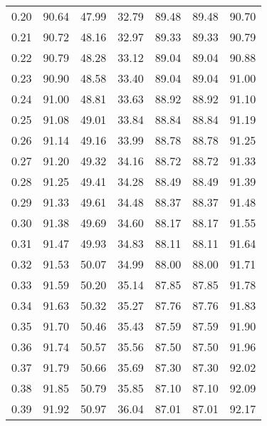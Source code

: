 \begin{tabular}{|c|c|c|c|c|c|c|}
      0.20 &     90.64 &     47.99 &      32.79 &   89.48 &      89.48 &         90.70 \\
      0.21 &     90.72 &     48.16 &      32.97 &   89.33 &      89.33 &         90.79 \\
      0.22 &     90.79 &     48.28 &      33.12 &   89.04 &      89.04 &         90.88 \\
      0.23 &     90.90 &     48.58 &      33.40 &   89.04 &      89.04 &         91.00 \\
      0.24 &     91.00 &     48.81 &      33.63 &   88.92 &      88.92 &         91.10 \\
      0.25 &     91.08 &     49.01 &      33.84 &   88.84 &      88.84 &         91.19 \\
      0.26 &     91.14 &     49.16 &      33.99 &   88.78 &      88.78 &         91.25 \\
      0.27 &     91.20 &     49.32 &      34.16 &   88.72 &      88.72 &         91.33 \\
      0.28 &     91.25 &     49.41 &      34.28 &   88.49 &      88.49 &         91.39 \\
      0.29 &     91.33 &     49.61 &      34.48 &   88.37 &      88.37 &         91.48 \\
      0.30 &     91.38 &     49.69 &      34.60 &   88.17 &      88.17 &         91.55 \\
      0.31 &     91.47 &     49.93 &      34.83 &   88.11 &      88.11 &         91.64 \\
      0.32 &     91.53 &     50.07 &      34.99 &   88.00 &      88.00 &         91.71 \\
      0.33 &     91.59 &     50.20 &      35.14 &   87.85 &      87.85 &         91.78 \\
      0.34 &     91.63 &     50.32 &      35.27 &   87.76 &      87.76 &         91.83 \\
      0.35 &     91.70 &     50.46 &      35.43 &   87.59 &      87.59 &         91.90 \\
      0.36 &     91.74 &     50.57 &      35.56 &   87.50 &      87.50 &         91.96 \\
      0.37 &     91.79 &     50.66 &      35.69 &   87.30 &      87.30 &         92.02 \\
      0.38 &     91.85 &     50.79 &      35.85 &   87.10 &      87.10 &         92.09 \\
      0.39 &     91.92 &     50.97 &      36.04 &   87.01 &      87.01 &         92.17 \\

\end{tabular}

